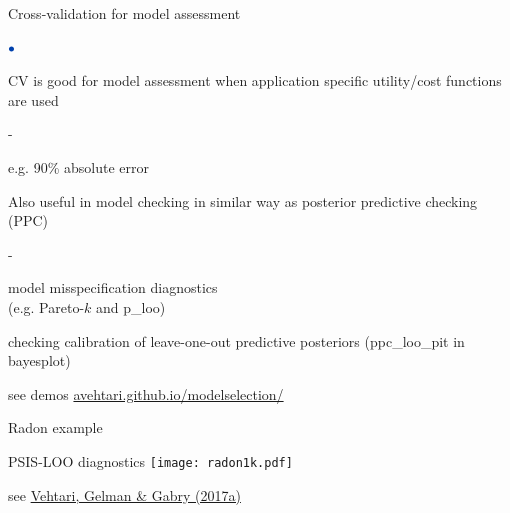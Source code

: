 \documentclass[english,t]{beamer}
\newenvironment{list1}{
   \begin{list}{$\color{list1}\bullet$}{\itemsep=6pt}}{
  \end{list}}
\newenvironment{list2}{
  \begin{list}{-}{\baselineskip=12pt\itemsep=2pt}}{
  \end{list}}
\begin{document}
\begin{frame}{Cross-validation for model assessment}

\begin{list1}
\item CV is good for model assessment when application specific utility/cost functions are used
  \begin{list2}
  \item e.g. 90\% absolute error
  \end{list2}
\item<2-> Also useful in model checking in similar way as posterior
  predictive checking (PPC)
  \begin{list2}
  \item model misspecification diagnostics\\ (e.g. Pareto-$k$ and p\_loo)
  \item checking calibration of leave-one-out predictive posteriors
    (ppc\_loo\_pit in bayesplot)
  \end{list2}
  {\small see demos \url{avehtari.github.io/modelselection/}}
\end{list1}

\end{frame}

\begin{frame}{Radon example}

   PSIS-LOO diagnostics
   \texttt{[image: radon1k.pdf]}

{\small see \href{http://link.springer.com/article/10.1007/s11222-016-9696-4}{Vehtari, Gelman \& Gabry (2017a)}}
   
 \end{frame}
\end{document}
